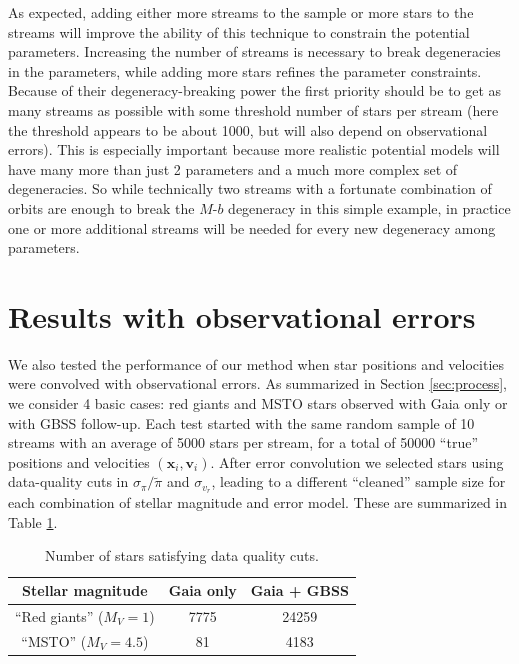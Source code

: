 \documentclass[useAMS,usenatbib,a4paper]{mn2e}
\begin{document}
As expected, adding either more streams to the sample or more stars to the streams will improve the ability of this technique to constrain the potential parameters. Increasing the number of streams is necessary to break degeneracies in the parameters, while adding more stars refines the parameter constraints. Because of their degeneracy-breaking power the first priority should be to get as many streams as possible with some threshold number of stars per stream (here the threshold appears to be about 1000, but will also depend on observational errors). This is especially important because more realistic potential models will have many more than just 2 parameters and a much more complex set of degeneracies. So while technically two streams with a fortunate combination of orbits are enough to break the $M$-$b$ degeneracy in this simple example, in practice one or more additional streams will be needed for every new degeneracy among parameters.


\section{Results with observational errors} 

We also tested the performance of our method when star positions and velocities were convolved with observational errors. As summarized in Section \ref{sec:process}, we consider 4 basic cases: red giants and MSTO stars observed with Gaia only or with GBSS follow-up. Each test started with the same random sample of 10 streams with an average of 5000 stars per stream, for a total of 50000 ``true'' positions and velocities $(\mathbf{x}_i,\mathbf{v}_i)$. After error convolution we selected stars using data-quality cuts in $\sigma_\pi/\tilde{\pi}$ and $\sigma_{v_r}$, leading to a different ``cleaned'' sample size for each combination of stellar magnitude and error model. These are summarized in Table \ref{tbl:cleanSampleSizes}. 

\begin{table}
\caption{Number of stars satisfying data quality cuts.}
 \begin{tabular}{ccc}
 Stellar magnitude & Gaia only & Gaia + GBSS \\
\hline
``Red giants'' ($M_V = 1$) & 7775 & 24259 \\
``MSTO'' ($M_V = 4.5$) & 81 & 4183 \\
\end{tabular}
\label{tbl:cleanSampleSizes}
\end{table}
\end{document}
